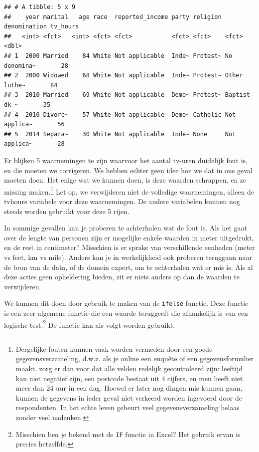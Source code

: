 \documentclass[]{tufte-book}
\begin{document}
\begin{verbatim}
## # A tibble: 5 x 9
##    year marital   age race  reported_income party religion denomination tv_hours
##   <int> <fct>   <int> <fct> <fct>           <fct> <fct>    <fct>           <dbl>
## 1  2000 Married    84 White Not applicable  Inde~ Protest~ No denomina~       28
## 2  2000 Widowed    68 White Not applicable  Inde~ Protest~ Other luthe~       84
## 3  2010 Married    69 White Not applicable  Demo~ Protest~ Baptist-dk ~       35
## 4  2010 Divorc~    57 White Not applicable  Demo~ Catholic Not applica~       56
## 5  2014 Separa~    30 White Not applicable  Inde~ None     Not applica~       28
\end{verbatim}

Er blijken 5 waarnemingen te zijn waarvoor het aantal tv-uren duidelijk fout is, en die moeten we corrigeren. We hebben echter geen idee hoe we dat in ons geval moeten doen. Het enige wat we kunnen doen, is deze waarden schrappen, en ze missing maken.\footnote{Dergelijke fouten kunnen vaak worden vermeden door een goede gegevensverzameling, d.w.z. als je online een enquête of een gegevensformulier maakt, zorg er dan voor dat alle velden redelijk gecontroleerd zijn: leeftijd kan niet negatief zijn, een postcode bestaat uit 4 cijfers, en men heeft niet meer dan 24 uur in een dag. Hoewel er later nog dingen mis kunnen gaan, kunnen de gegevens in ieder geval niet verkeerd worden ingevoerd door de respondenten. In het echte leven gebeurt veel gegevensverzameling helaas zonder veel nadenken.} Let op, we verwijderen niet de volledige waarnemingen, alleen de tvhours variabele voor deze waarnemingen. De andere variabelen kunnen nog steeds worden gebruikt voor deze 5 rijen.

In sommige gevallen kan je proberen te achterhalen wat de fout is. Als het gaat over de lengte van personen zijn er mogelijke enkele waarden in meter uitgedrukt, en de rest in centimeter? Misschien is er sprake van verschillende eenheden (meter vs feet, km vs mile). Anders kan je in werkelijkheid ook proberen teruggaan naar de bron van de data, of de domein expert, om te achterhalen wat er mis is. Als al deze acties geen opheldering bieden, zit er niets anders op dan de waarden te verwijderen.

We kunnen dit doen door gebruik te maken van de \texttt{ifelse} functie. Deze functie is een zeer algemene functie die een waarde teruggeeft die afhankelijk is van een logische test.\footnote{Misschien ben je bekend met de \texttt{IF} functie in Excel? Het gebruik ervan is precies hetzelfde.} De functie kan als volgt worden gebruikt.
\end{document}
